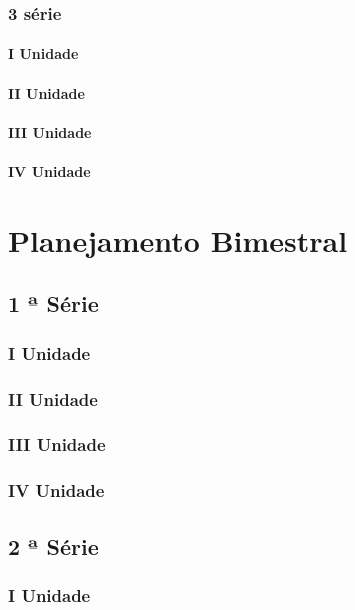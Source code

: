 \documentclass[12pt,a4paper]{book}
\begin{document}
		
		
		\subsection{3 série}
		
			\subsubsection{I Unidade}
			
			\subsubsection{II Unidade}
			
			\subsubsection{III Unidade}
			
			\subsubsection{IV Unidade}
			

\chapter{Planejamento Bimestral}
	\section{1 ª Série}
		\subsection{I Unidade}
		\subsection{II Unidade}
		\subsection{III Unidade}
		\subsection{IV Unidade}
	
	\section{2 ª Série}
		\subsection{I Unidade}
\end{document}
